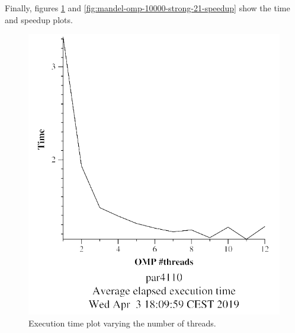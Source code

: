 \documentclass[12pt, a4paper]{article}
\begin{document}
Finally, figures \ref{fig:mandel-omp-10000-strong-21-time} and \ref{fig:mandel-omp-10000-strong-21-speedup} show the time and speedup plots.

\begin{figure}[H]
\centering
\begin{minipage}[b]{0.4\linewidth}
  \centering
  \includegraphics[scale=0.5]{./mandel-omp-10000-strong-21-time}
  \caption{Execution time plot varying the number of threads.}
  \label{fig:mandel-omp-10000-strong-21-time}
\end{minipage}%
\hspace{0.5cm}
\begin{minipage}[b]{0.4\linewidth}
  \centering

\end{minipage}
\end{figure}
\end{document}

